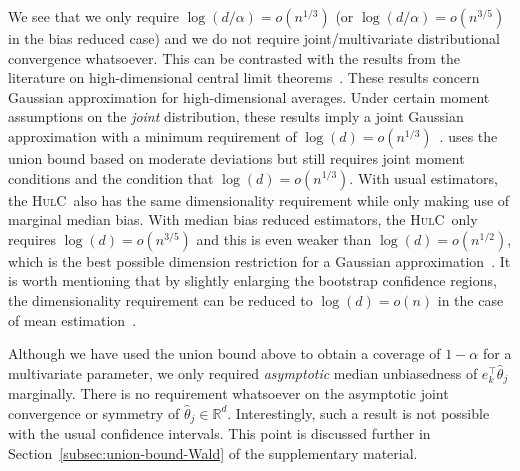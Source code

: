 \documentclass{article}
\newcommand{\hulc}{\textsc{HulC}~}
\numberwithin{myalgctr}{section}
\begin{document}
We see that we only require
$\log(d/\alpha) = o(n^{1/3})$ 
(or $\log(d/\alpha) = o(n^{3/5})$ in the bias reduced case)
and we do not require joint/multivariate distributional 
convergence whatsoever. This can be contrasted with the results from
the literature on high-dimensional central limit
theorems~\citep{belloni2018high,koike2020notes,fang2020high,deng2020slightly,chernozhukov2020nearly}.
These results %
concern
Gaussian approximation for high-dimensional averages. Under certain
moment assumptions on the \emph{joint} distribution, these results
imply a joint Gaussian approximation with a minimum requirement
of $\log(d) = o(n^{1/3})$~\citep[Proposition
  1.1]{fang2020high}. \citet[Theorem 2.3]{belloni2018high} uses the union bound based on moderate deviations but still
  requires joint moment conditions and the 
  condition that  
$\log(d) =
o(n^{1/3})$. With usual
estimators, the \hulc also has the same dimensionality requirement while
only making use of marginal median bias. With median bias reduced
estimators, the \hulc only requires $\log(d) = o(n^{3/5})$ and this is even
weaker than $\log(d) = o(n^{1/2})$, which is the best possible
dimension restriction for a Gaussian approximation~\citep[Theorem
  3]{das2020central}. It is worth mentioning that by slightly
enlarging the bootstrap confidence regions, the dimensionality
requirement can be reduced to $\log(d) =
o(n)$ in the case of mean estimation~\citep{deng2020slightly}.

Although we have used the union bound above to obtain a coverage of $1-\alpha$ for a multivariate parameter, we only required \emph{asymptotic} median unbiasedness of $e_k^{\top}\widehat{\theta}_j$ marginally. There is no requirement whatsoever on the asymptotic joint convergence or symmetry of $\widehat{\theta}_j\in\mathbb{R}^d$. Interestingly, such a result is not possible with the usual confidence intervals. This point is discussed further in Section~\ref{subsec:union-bound-Wald} of the supplementary material.
\end{document}
